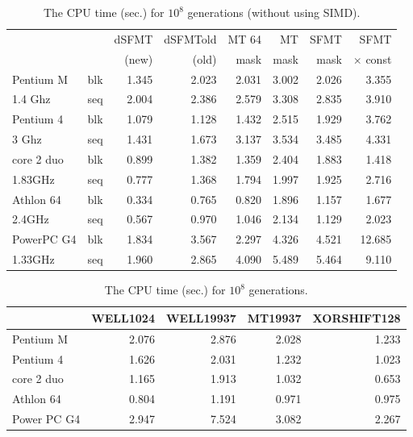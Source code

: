 \documentclass{svmult}
\begin{document}
\begin{table}
  \begin{center}
    \caption{The CPU time (sec.) for $10^8$ generations (without using SIMD).}
    \label{tab:speed-c}
    \begin{tabular}{|ll|r|r|r|r|r|r|} \hline
      &  & dSFMT & dSFMTold & MT 64 & MT & SFMT & SFMT \\
      &  &(new)&(old)& mask & mask & mask & $\times$ const \\ \hline\hline
      Pentium M & blk & 1.345 & 2.023 & 2.031 & 3.002 & 2.026 & 3.355 \\
      1.4 Ghz & seq & 2.004 & 2.386 & 2.579 & 3.308 & 2.835 & 3.910 \\ \hline
      Pentium 4 & blk & 1.079 & 1.128 & 1.432 & 2.515 & 1.929 & 3.762 \\
      3 Ghz & seq & 1.431 & 1.673 & 3.137 & 3.534 & 3.485 & 4.331 \\ \hline
      core 2 duo & blk & 0.899 & 1.382 & 1.359 & 2.404 & 1.883 & 1.418 \\
      1.83GHz & seq & 0.777 & 1.368 & 1.794 & 1.997 & 1.925 & 2.716 \\ \hline
      Athlon 64 & blk & 0.334 & 0.765 & 0.820 & 1.896 & 1.157 & 1.677 \\
      2.4GHz & seq & 0.567 & 0.970 & 1.046 & 2.134 & 1.129 & 2.023 \\ \hline
      PowerPC G4 & blk & 1.834 & 3.567 & 2.297 & 4.326 & 4.521 & 12.685 \\
      1.33GHz & seq & 1.960 & 2.865 & 4.090 & 5.489 & 5.464 & 9.110 \\ \hline
    \end{tabular}
  \end{center}
\end{table}

\begin{table}
  \begin{center}
    \caption{The CPU time (sec.) for $10^8$ generations.}
    \label{tab:speed-other}
    \begin{tabular}{|l|r|r|r|r|} \hline
      & WELL1024 & WELL19937 & MT19937 & XORSHIFT128 \\ \hline
      Pentium M & 2.076 & 2.876 & 2.028 & 1.233 \\
      Pentium 4 & 1.626 & 2.031 & 1.232 & 1.023 \\
      core 2 duo & 1.165 & 1.913 & 1.032 & 0.653 \\
      Athlon 64 & 0.804 & 1.191 & 0.971 & 0.975 \\
      Power PC G4 & 2.947 & 7.524 & 3.082 & 2.267 \\ \hline
    \end{tabular}
  \end{center}
\end{table}
\end{document}
